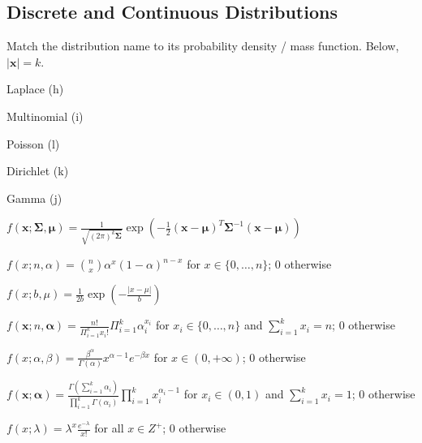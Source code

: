 \documentclass[a4paper]{article}
\theoremstyle{definition}
\newcommand{\vc}[1]{\boldsymbol{#1}}
\newcommand{\xv}{\vc{x}}
\newcommand{\Sigmav}{\vc{\Sigma}}
\newcommand{\alphav}{\vc{\alpha}}
\newcommand{\muv}{\vc{\mu}}
\newenvironment{soln}{
    \leavevmode\color{blue}\ignorespaces
}{}
\begin{document}
\subsection{Discrete and Continuous Distributions}
Match the distribution name to its probability density / mass
function. Below, $|\xv| = k$.
\begin{enumerate}[(a)]
\begin{minipage}{0.3\linewidth}
    \item Laplace \begin{soln} (h) \end{soln}
    \item Multinomial \begin{soln} (i) \end{soln}
    \item Poisson \begin{soln} (l) \end{soln}
    \item Dirichlet \begin{soln} (k) \end{soln}
    \item Gamma \begin{soln} (j) \end{soln}
\end{minipage}
\begin{minipage}{0.5\linewidth}
    \item $f(\xv; \Sigmav, \muv) = \frac{1}{\sqrt{(2\pi)^k \Sigmav}} \exp\left( -\frac{1}{2}
        (\xv - \muv)^T \Sigmav^{-1} (\xv - \muv)  \right)$
    \item $f(x; n, \alpha) = \binom{n}{x} \alpha^x (1 - \alpha)^{n-x}$
      for $x \in \{0,\ldots, n\}$; $0$ otherwise
    \item $f(x; b, \mu) = \frac{1}{2b} \exp\left( - \frac{|x - \mu|}{b} \right)$
    \item $f(\xv; n, \alphav) = \frac{n!}{\Pi_{i=1}^k x_i!}
      \Pi_{i=1}^k \alpha_i^{x_i}$ for $x_i \in \{0,\ldots,n\}$ and
      $\sum_{i=1}^k x_i = n$; $0$ otherwise
    \item $f(x; \alpha, \beta) = \frac{\beta^{\alpha}}{\Gamma(\alpha)} x^{\alpha -
        1}e^{-\beta x}$ for $x \in (0,+\infty)$; $0$ otherwise
    \item $f(\xv; \alphav) = \frac{\Gamma(\sum_{i=1}^k
        \alpha_i)}{\prod_{i=1}^k \Gamma(\alpha_i)} \prod_{i=1}^{k}
      x_i^{\alpha_i - 1}$ for $x_i \in (0,1)$ and $\sum_{i=1}^k x_i =
      1$; 0 otherwise
    \item $f(x; \lambda) = \lambda^x \frac{e^{-\lambda}}{x!}$ for all
      $x \in Z^+$; $0$ otherwise
\end{minipage}
\end{enumerate}
        
\end{document}
